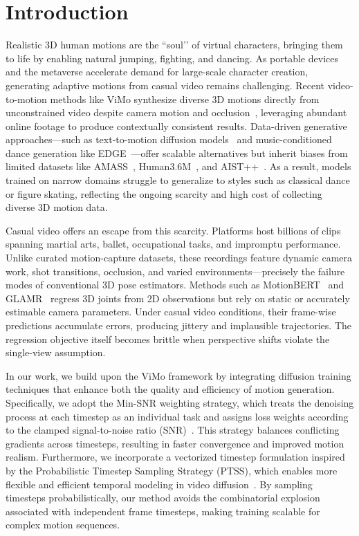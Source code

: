 \section{Introduction}
\label{sec:intro}

Realistic 3D human motions are the “soul’’ of virtual characters, bringing them to life by enabling natural jumping, fighting, and dancing. As portable devices and the metaverse accelerate demand for large-scale character creation, generating adaptive motions from casual video remains challenging. Recent video-to-motion methods like ViMo synthesize diverse 3D motions directly from unconstrained video despite camera motion and occlusion~\cite{vimo2024}, leveraging abundant online footage to produce contextually consistent results. Data-driven generative approaches—such as text-to-motion diffusion models~\cite{motiondiffuse2022} and music-conditioned dance generation like EDGE~\cite{edge2023}—offer scalable alternatives but inherit biases from limited datasets like AMASS~\cite{amass2019}, Human3.6M~\cite{h3wb2014}, and AIST++~\cite{aist2021}. As a result, models trained on narrow domains struggle to generalize to styles such as classical dance or figure skating, reflecting the ongoing scarcity and high cost of collecting diverse 3D motion data.

Casual video offers an escape from this scarcity. Platforms host billions of clips spanning martial arts, ballet, occupational tasks, and impromptu performance. Unlike curated motion-capture datasets, these recordings feature dynamic camera work, shot transitions, occlusion, and varied environments—precisely the failure modes of conventional 3D pose estimators. Methods such as MotionBERT~\cite{motionbert2023} and GLAMR~\cite{glamr2022} regress 3D joints from 2D observations but rely on static or accurately estimable camera parameters. Under casual video conditions, their frame-wise predictions accumulate errors, producing jittery and implausible trajectories. The regression objective itself becomes brittle when perspective shifts violate the single-view assumption.

In our work, we build upon the ViMo framework by integrating diffusion training techniques that enhance both the quality and efficiency of motion generation. Specifically, we adopt the Min-SNR weighting strategy, which treats the denoising process at each timestep as an individual task and assigns loss weights according to the clamped signal-to-noise ratio (SNR)~\cite{minsnr2024}. This strategy balances conflicting gradients across timesteps, resulting in faster convergence and improved motion realism. Furthermore, we incorporate a vectorized timestep formulation inspired by the Probabilistic Timestep Sampling Strategy (PTSS), which enables more flexible and efficient temporal modeling in video diffusion~\cite{ptss2024}. By sampling timesteps probabilistically, our method avoids the combinatorial explosion associated with independent frame timesteps, making training scalable for complex motion sequences.

